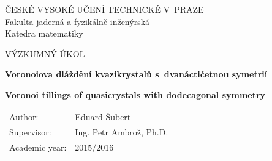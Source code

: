 \documentclass[a4paper,10pt,twoside]{article}
\theoremstyle{definition}
\theoremstyle{remark}
\begin{document}








\clearpage
\pagestyle{empty}
\cleardoublepage

\thispagestyle{empty}

\begin{center}

{\Large ČESKÉ VYSOKÉ UČENÍ TECHNICKÉ V~PRAZE} \\[3.5mm]
{\Large Fakulta jaderná a fyzikálně inženýrská} \\[3.5mm]
{\Large Katedra matematiky}


{\Large VÝZKUMNÝ ÚKOL}


{\LARGE
\textbf{Voronoiova dláždění kvazikrystalů s~dvanáctičetnou symetrií}
\par}

\vspace{1cm}

{\LARGE
\textbf{Voronoi tillings of quasicrystals with dodecagonal symmetry}
\par}


\end{center}

\begin{tabular}{ll} 
{\Large Author:} & {\Large Eduard Šubert} \\[1mm]
{\Large Supervisor:} & {\Large Ing. Petr Ambrož, Ph.D.} \\[1mm]
{\Large Academic year:}     & {\Large 2015/2016}
\end{tabular}
\end{document}
